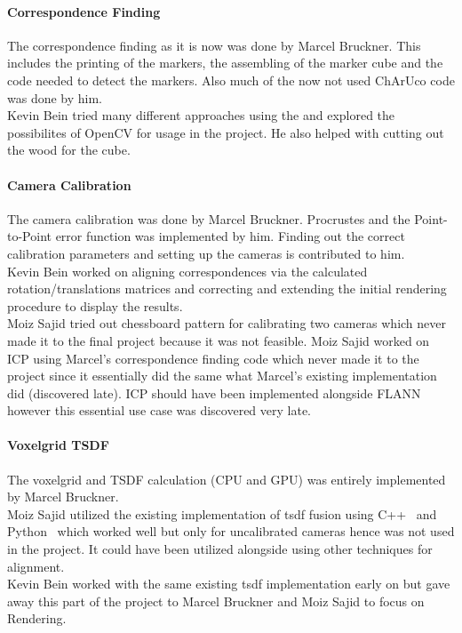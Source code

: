 \documentclass[10pt,twocolumn,letterpaper]{article}
\begin{document}
\paragraph{Correspondence Finding}
The correspondence finding as it is now was done by Marcel Bruckner. This includes the printing of the markers, the assembling of the marker cube and the code needed to detect the markers. Also much of the now not used ChArUco code was done by him.\\
Kevin Bein tried many different approaches using the \charuco{} and explored the possibilites of OpenCV for usage in the project. He also helped with cutting out the wood for the cube.

\paragraph{Camera Calibration}
The camera calibration was done by Marcel Bruckner. Procrustes and the Point-to-Point error function was implemented by him. Finding out the correct calibration parameters and setting up the cameras is contributed to him.\\
Kevin Bein worked on aligning correspondences via the calculated rotation/translations matrices and correcting and extending the initial rendering procedure to display the results. \\
Moiz Sajid tried out chessboard pattern for calibrating two cameras which never made it to the final project because it was not feasible. Moiz Sajid worked on ICP using Marcel's correspondence finding code which never made it to the project since it essentially did the same what Marcel's existing implementation did (discovered late). ICP should have been implemented alongside FLANN however this essential use case was discovered very late.   

\paragraph{Voxelgrid TSDF}
The voxelgrid and TSDF calculation (CPU and GPU) was entirely implemented by Marcel Bruckner.\\
Moiz Sajid utilized the existing implementation of tsdf fusion using C++~\cite{Authors2} and Python~\cite{Authors8} which worked well but only for uncalibrated cameras hence was not used in the project. It could have been utilized alongside using other techniques for alignment. \\
Kevin Bein worked with the same existing tsdf implementation \cite{Authors2} early on but gave away this part of the project to Marcel Bruckner and Moiz Sajid to focus on Rendering.
\end{document}

